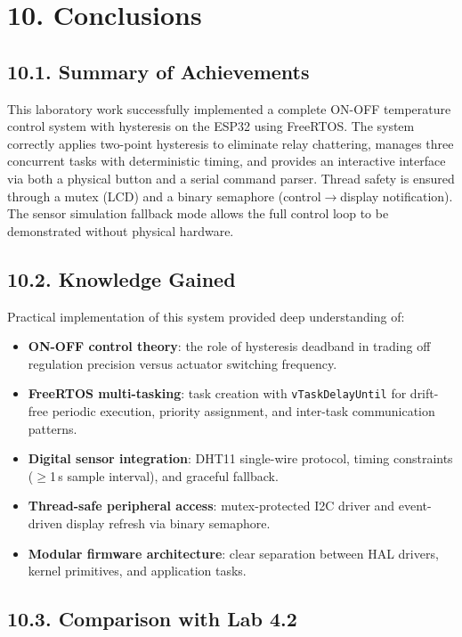 \documentclass[12pt]{article}
\begin{document}
\section*{10. Conclusions}

\subsection*{10.1. Summary of Achievements}

This laboratory work successfully implemented a complete ON-OFF temperature control
system with hysteresis on the ESP32 using FreeRTOS. The system correctly applies
two-point hysteresis to eliminate relay chattering, manages three concurrent tasks
with deterministic timing, and provides an interactive interface via both a physical
button and a serial command parser. Thread safety is ensured through a mutex (LCD)
and a binary semaphore (control$\to$display notification). The sensor simulation
fallback mode allows the full control loop to be demonstrated without physical
hardware.

\subsection*{10.2. Knowledge Gained}

Practical implementation of this system provided deep understanding of:
\begin{itemize}
    \item \textbf{ON-OFF control theory}: the role of hysteresis deadband in trading
          off regulation precision versus actuator switching frequency.
    \item \textbf{FreeRTOS multi-tasking}: task creation with
          \texttt{vTaskDelayUntil} for drift-free periodic execution, priority
          assignment, and inter-task communication patterns.
    \item \textbf{Digital sensor integration}: DHT11 single-wire protocol,
          timing constraints ($\ge$1\,s sample interval), and graceful fallback.
    \item \textbf{Thread-safe peripheral access}: mutex-protected I2C driver and
          event-driven display refresh via binary semaphore.
    \item \textbf{Modular firmware architecture}: clear separation between HAL
          drivers, kernel primitives, and application tasks.
\end{itemize}

\subsection*{10.3. Comparison with Lab 4.2}
\end{document}
